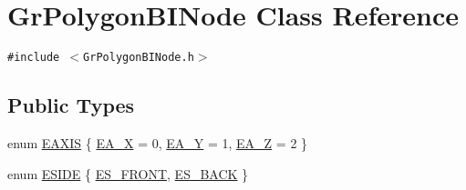 \hypertarget{class_gr_polygon_b_i_node}{
\section{GrPolygonBINode Class Reference}
\label{class_gr_polygon_b_i_node}
}
{\tt \#include $<$GrPolygonBINode.h$>$}

\subsection*{Public Types}
\begin{CompactItemize}
\item 
enum \hyperlink{class_gr_polygon_b_i_node_3647d87a0c6d714a653119379817a057}{EAXIS} \{ \hyperlink{class_gr_polygon_b_i_node_3647d87a0c6d714a653119379817a0575e118d237424d5c6cca7c4d031ac165d}{EA\_\-X} =  0, 
\hyperlink{class_gr_polygon_b_i_node_3647d87a0c6d714a653119379817a0572ad5e12436b8278fbc46d757441d3b90}{EA\_\-Y} =  1, 
\hyperlink{class_gr_polygon_b_i_node_3647d87a0c6d714a653119379817a057963338b1288658172320d9f3d73feb5b}{EA\_\-Z} =  2
 \}
\item 
enum \hyperlink{class_gr_polygon_b_i_node_1ef624ba045eb18ffd2bb7dbb16d8090}{ESIDE} \{ \hyperlink{class_gr_polygon_b_i_node_1ef624ba045eb18ffd2bb7dbb16d8090f724f5c5df1ed773ce60e4df85485382}{ES\_\-FRONT}, 
\hyperlink{class_gr_polygon_b_i_node_1ef624ba045eb18ffd2bb7dbb16d8090bd853ea225de2f66118ba5557c11a08a}{ES\_\-BACK}
 \}

\end{CompactItemize}
